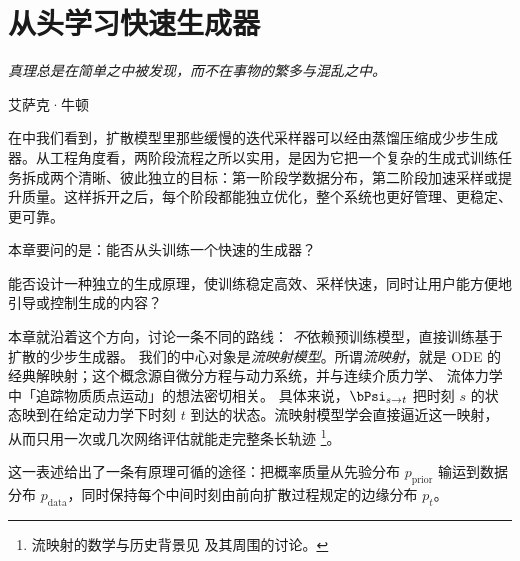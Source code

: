 \chapter{从头学习快速生成器}\label{ch:fast-scratch}

\epigraph{
    \textit{真理总是在简单之中被发现，而不在事物的繁多与混乱之中。
}}{艾萨克·牛顿}


在中我们看到，扩散模型里那些缓慢的迭代采样器可以经由蒸馏压缩成少步生成器。从工程角度看，两阶段流程之所以实用，是因为它把一个复杂的生成式训练任务拆成两个清晰、彼此独立的目标：第一阶段学数据分布，第二阶段加速采样或提升质量。这样拆开之后，每个阶段都能独立优化，整个系统也更好管理、更稳定、更可靠。

本章要问的是：能否从头训练一个快速的生成器？
\begin{question}
    能否设计一种独立的生成原理，使训练稳定高效、采样快速，同时让用户能方便地引导或控制生成的内容？
\end{question}
本章就沿着这个方向，讨论一条不同的路线：
\emph{不}依赖预训练模型，直接训练基于扩散的少步生成器。
我们的中心对象是\emph{流映射模型}。所谓\emph{流映射}，就是 ODE
的经典解映射；这个概念源自微分方程与动力系统，并与连续介质力学、
流体力学中「追踪物质质点运动」的想法密切相关。
具体来说，$\bPsi_{s\to t}$ 把时刻 $s$ 的状态映到在给定动力学下时刻 $t$ 到达的状态。流映射模型学会直接逼近这一映射，
从而只用一次或几次网络评估就能走完整条长轨迹
\footnote{流映射的数学与历史背景见  及其周围的讨论。}。

这一表述给出了一条有原理可循的途径：把概率质量从先验分布
$p_{\mathrm{prior}}$ 输运到数据分布 $p_{\mathrm{data}}$，同时保持每个中间时刻由前向扩散过程规定的边缘分布 $p_t$。



